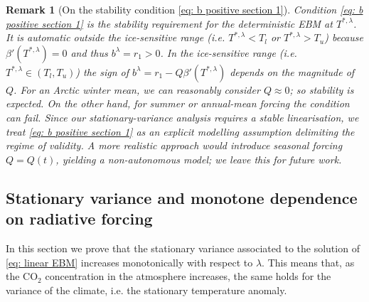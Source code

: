 \documentclass[10pt]{amsart}
\newtheorem{remark}[theorem]{Remark}
\numberwithin{equation}{section}
\begin{document}
\begin{remark}[On the stability condition \eqref{eq: b positive section 1}]
Condition \eqref{eq: b positive section 1} is the stability requirement for the deterministic EBM at
$T^{*,\lambda}$. It is automatic outside the ice-sensitive range (i.e. $T^{*,\lambda} < T_l$ or $T^{*,\lambda} > T_u$) because $\beta'(T^{*,\lambda})=0$ and thus
$b^\lambda=r_1>0$. In the ice-sensitive range (i.e. $T^{*,\lambda} \in (T_l,T_u)$) the sign of $b^\lambda=r_1-Q\beta'(T^{*,\lambda})$
depends on the magnitude of $Q$. For an Arctic winter mean, we can reasonably consider $Q\approx 0$; so stability is
expected. On the other hand, for summer or annual-mean forcing the condition can fail. Since our stationary-variance
analysis requires a stable linearisation, we treat \eqref{eq: b positive section 1} as an explicit modelling
assumption delimiting the regime of validity. A more realistic approach would introduce seasonal forcing
$Q=Q(t)$, yielding a non-autonomous model; we leave this for future work.
\end{remark}






\subsection{Stationary variance and monotone dependence on radiative forcing}
\label{subsec: stationary variance and monotone dependence on CO2}
In this section we prove that the stationary variance associated to the solution of \eqref{eq: linear EBM} increases monotonically with respect to $\lambda$. This means that, as the $\text{CO}_2$ concentration in the atmosphere increases, the same holds for the variance of the climate, i.e. the stationary temperature anomaly.
\end{document}
